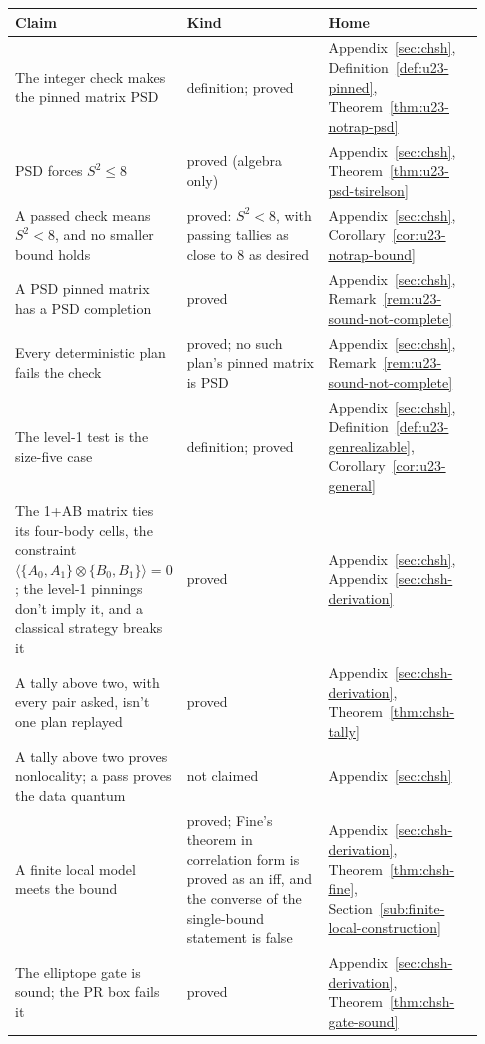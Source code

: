 \documentclass[11pt,twoside]{article}
\theoremstyle{thielethm}
\theoremstyle{thieledef}
\theoremstyle{thieledef}
\theoremstyle{thieledef}
\theoremstyle{thielethm}
\theoremstyle{thieleobs}
\theoremstyle{thielethm}
\begin{document}
\begingroup\small
\begin{longtable}{@{}>{\raggedright\arraybackslash}p{0.242\linewidth}>{\raggedright\arraybackslash}p{0.344\linewidth}>{\raggedright\arraybackslash}p{0.344\linewidth}@{}}
\toprule
\textbf{Claim} & \textbf{Kind} & \textbf{Home} \\
\midrule
\endhead
\bottomrule
\endlastfoot
The integer check makes the pinned matrix PSD & definition; proved & Appendix~\ref{sec:chsh}, Definition~\ref{def:u23-pinned}, Theorem~\ref{thm:u23-notrap-psd} \\
PSD forces $S^2 \le 8$ & proved (algebra only) & Appendix~\ref{sec:chsh}, Theorem~\ref{thm:u23-psd-tsirelson} \\
A passed check means $S^2 < 8$, and no smaller bound holds & proved: $S^2 < 8$, with passing tallies as close to 8 as desired & Appendix~\ref{sec:chsh}, Corollary~\ref{cor:u23-notrap-bound} \\
A PSD pinned matrix has a PSD completion & proved & Appendix~\ref{sec:chsh}, Remark~\ref{rem:u23-sound-not-complete} \\
Every deterministic plan fails the check & proved; no such plan's pinned matrix is PSD  & Appendix~\ref{sec:chsh}, Remark~\ref{rem:u23-sound-not-complete} \\
The level-1 test is the size-five case & definition; proved & Appendix~\ref{sec:chsh}, Definition~\ref{def:u23-genrealizable}, Corollary~\ref{cor:u23-general} \\
The 1+AB matrix ties its four-body cells, the constraint $\langle \{A_0, A_1\} \otimes \{B_0, B_1\} \rangle = 0$; the level-1 pinnings don't imply it, and a classical strategy breaks it & proved  & Appendix~\ref{sec:chsh}, Appendix~\ref{sec:chsh-derivation} \\
A tally above two, with every pair asked, isn't one plan replayed & proved & Appendix~\ref{sec:chsh-derivation}, Theorem~\ref{thm:chsh-tally} \\
A tally above two proves nonlocality; a pass proves the data quantum & not claimed & Appendix~\ref{sec:chsh} \\
A finite local model meets the bound & proved; Fine's theorem in correlation form is proved as an iff, and the converse of the single-bound statement is false  & Appendix~\ref{sec:chsh-derivation}, Theorem~\ref{thm:chsh-fine}, Section~\ref{sub:finite-local-construction} \\
The elliptope gate is sound; the PR box fails it & proved & Appendix~\ref{sec:chsh-derivation}, Theorem~\ref{thm:chsh-gate-sound} \\

\end{longtable}
\end{document}
